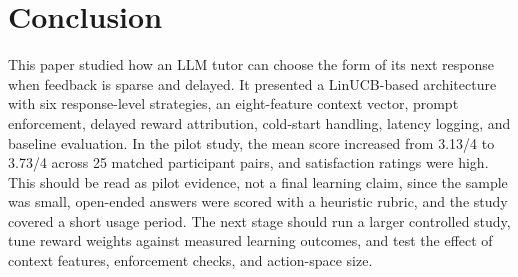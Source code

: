 \documentclass[conference]{IEEEtran}
\begin{document}
\section{Conclusion}

This paper studied how an LLM tutor can choose the form of its next response when feedback is sparse and delayed. It presented a LinUCB-based architecture with six response-level strategies, an eight-feature context vector, prompt enforcement, delayed reward attribution, cold-start handling, latency logging, and baseline evaluation. In the pilot study, the mean score increased from 3.13/4 to 3.73/4 across 25 matched participant pairs, and satisfaction ratings were high. This should be read as pilot evidence, not a final learning claim, since the sample was small, open-ended answers were scored with a heuristic rubric, and the study covered a short usage period. The next stage should run a larger controlled study, tune reward weights against measured learning outcomes, and test the effect of context features, enforcement checks, and action-space size.
\end{document}

